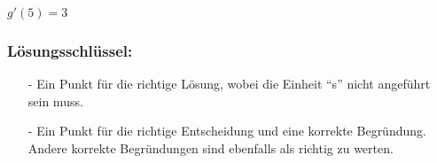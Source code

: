 \begin{langesbeispiel}
{\begin{enumerate}
$g'(5)=3$

\subsubsection{Lösungsschlüssel:}

\begin{itemize}
	\item[-] Ein Punkt für die richtige Lösung, wobei die Einheit "`s"' nicht angeführt sein muss.
	\item[-] Ein Punkt für die richtige Entscheidung und eine korrekte Begründung. Andere korrekte Begründungen sind ebenfalls als richtig zu werten.
\end{itemize}

\end{enumerate}}				
\end{langesbeispiel}